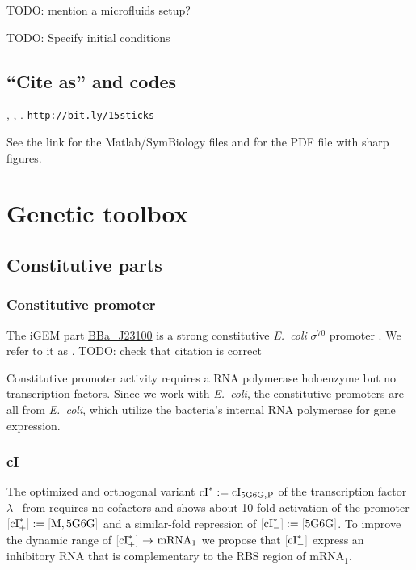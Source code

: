 \documentclass[12pt,notitlepage]{article}
\newcommand{\TODO}[1]{\textrm{\color{red}TODO: #1}}
\newcommand{\cbra}[1]{{\ensuremath{\color{gray}{#1}}}}
\newcommand{\promoter}[1]{{{\cbra{[}\ce{#1}\cbra{]}}}}
\newcommand{\act}{\ {\ensuremath{\mathbin{\to}}}\ }
\newcommand{\hh}[1]{{\color{Purple}#1}}
\newcommand{\ra}[1]{{\color{Blue}#1}}
\newcommand{\linktodoc}{http://bit.ly/15sticks}
\begin{document}
\TODO{mention a microfluids setup?}


\TODO{Specify initial conditions}


\subsection{``Cite as'' and codes}

\MyTitle, \MyAuthor, \MyDate.
\href{\linktodoc}{{\small\texttt{\linktodoc}}}

See the link 
for the Matlab/SymBiology files
and 
for the PDF file with sharp figures.


\section{Genetic toolbox} \label{s:genetic}


\subsection{Constitutive parts} \label{ss:const}

\subsubsection*{Constitutive promoter} \label{ss:Pc}

\ra{
The iGEM part 
\href{http://parts.igem.org/Part:BBa_J23100}{BBa\_J23100}
is a strong constitutive \emph{E.~coli} $\sigma^{70}$ promoter
\cite{iGem_Pc}.
%
We refer to it as \ce{P_c}.
%
\TODO{check that citation is correct}
}

\hh{
Constitutive promoter activity requires \ra{a} RNA polymerase holoenzyme
but no transcription factors. 
%
Since we work with \emph{E.~coli},
the constitutive promoters are all from \emph{E.~coli}, 
which utilize the bacteria's internal RNA polymerase for gene expression. 

}



\subsubsection*{cI} \label{ss:cI}

\ra{
The optimized and orthogonal variant
$\ce{cI^*} := \ce{cI_{5G6G,P}}$
of the transcription factor 
\href{https://www.uniprot.org/uniprot/P03034}{$\lambda$~\ce{cI}}
from
\cite[\href{https://www.nature.com/articles/ncomms13858/figures/4}{Fig.~4c/d}]{BroedelJaramilloIsalan2016}
requires no cofactors
and
shows 
about 10-fold activation of the promoter
$\promoter{cI^*_+} := \promoter{M,{5G6G}}$
and 
a similar-fold repression of 
$\promoter{cI^*_-} := \promoter{{5G6G}}$.
%
%
To improve the dynamic range of 
$\promoter{cI^*_+} \act \text{mRNA}_1$
we propose 
that
$\promoter{cI^*_-}$ express
an inhibitory RNA that is complementary
to the RBS region of $\text{mRNA}_1$.
}
\end{document}
